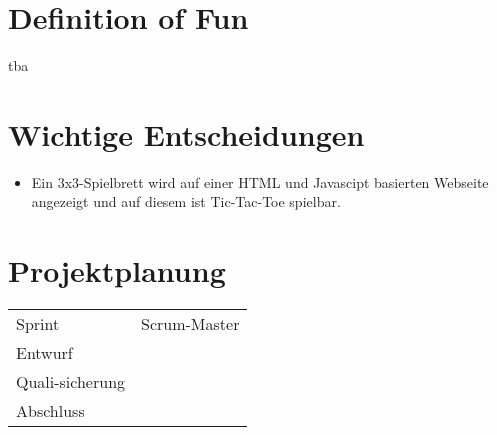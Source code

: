 \documentclass[titlepage]{scrartcl}
\begin{document}
\section{Definition of Fun}%
tba
\section{Wichtige Entscheidungen}
\begin{itemize}
\item Ein 3x3-Spielbrett wird auf einer HTML und Javascipt basierten Webseite angezeigt und auf diesem ist Tic-Tac-Toe spielbar.
\end{itemize}
\section{Projektplanung}%
\begin{tabular}{lc}
	Sprint & Scrum-Master\\
	Entwurf & \\
	Quali-sicherung & \\
	Abschluss & \\
\end{tabular}
\end{document}
